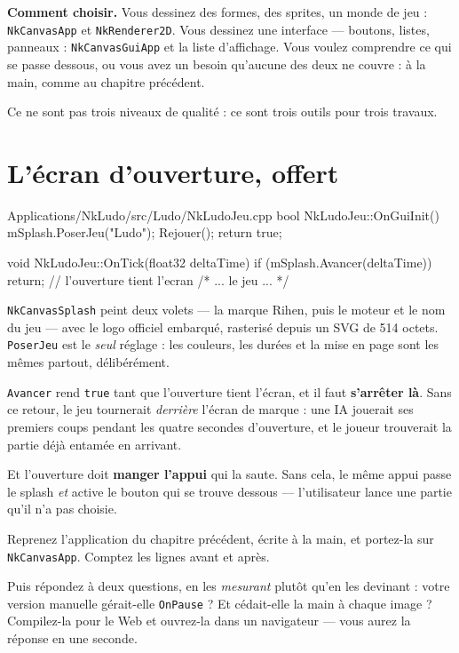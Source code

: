 \begin{nkretenir}
\textbf{Comment choisir.} Vous dessinez des formes, des sprites, un monde de
jeu : \texttt{NkCanvasApp} et \texttt{NkRenderer2D}. Vous dessinez une interface
--- boutons, listes, panneaux : \texttt{NkCanvasGuiApp} et la liste
d'affichage. Vous voulez comprendre ce qui se passe dessous, ou vous avez un
besoin qu'aucune des deux ne couvre : à la main, comme au chapitre précédent.

Ce ne sont pas trois niveaux de qualité : ce sont trois outils pour trois
travaux.
\end{nkretenir}

\section{L'écran d'ouverture, offert}

\begin{nkcode}{Applications/NkLudo/src/Ludo/NkLudoJeu.cpp}
bool NkLudoJeu::OnGuiInit() {
    mSplash.PoserJeu("Ludo");
    Rejouer();
    return true;
}

void NkLudoJeu::OnTick(float32 deltaTime) {
    if (mSplash.Avancer(deltaTime)) {
        return;                       // l'ouverture tient l'ecran
    }
    /* ... le jeu ... */
}
\end{nkcode}

\texttt{NkCanvasSplash} peint deux volets --- la marque Rihen, puis le moteur et
le nom du jeu --- avec le logo officiel embarqué, rasterisé depuis un SVG de
514 octets. \texttt{PoserJeu} est le \emph{seul} réglage : les couleurs, les
durées et la mise en page sont les mêmes partout, délibérément.

\begin{nkpiege}
\texttt{Avancer} rend \texttt{true} tant que l'ouverture tient l'écran, et il
faut \textbf{s'arrêter là}. Sans ce retour, le jeu tournerait \emph{derrière}
l'écran de marque : une IA jouerait ses premiers coups pendant les quatre
secondes d'ouverture, et le joueur trouverait la partie déjà entamée en arrivant.

Et l'ouverture doit \textbf{manger l'appui} qui la saute. Sans cela, le même
appui passe le splash \emph{et} active le bouton qui se trouve dessous ---
l'utilisateur lance une partie qu'il n'a pas choisie.
\end{nkpiege}

\begin{nkpratique}
Reprenez l'application du chapitre précédent, écrite à la main, et portez-la sur
\texttt{NkCanvasApp}. Comptez les lignes avant et après.

Puis répondez à deux questions, en les \emph{mesurant} plutôt qu'en les
devinant : votre version manuelle gérait-elle \texttt{OnPause} ? Et cédait-elle
la main à chaque image ? Compilez-la pour le Web et ouvrez-la dans un
navigateur --- vous aurez la réponse en une seconde.
\end{nkpratique}

